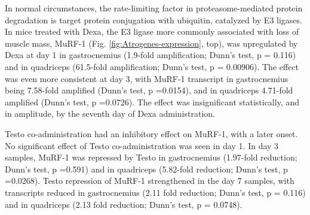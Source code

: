 \documentclass[12pt,english]{report}\usepackage[]{graphicx}\usepackage[]{color}
\begin{document}
In normal circumstances, the rate-limiting factor in proteasome-mediated
protein degradation is target protein conjugation with ubiquitin,
catalyzed by E3 ligases. In mice treated with Dexa, the E3 ligase
more commonly associated with loss of muscle mass, MuRF-1 (Fig. \ref{fig:Atrogenes-expression},
top), was upregulated by Dexa at day 1 in gastrocnemius (1.9-fold
amplification; Dunn's test, p = 0.116)
and in quadriceps (61.5-fold
amplification; Dunn's test, p = 0.00906).
The effect was even more consistent at day 3, with MuRF-1 transcript
in gastrocnemius being 7.58-fold
amplified (Dunn's test, p =0.0154),
and in quadriceps 4.71-fold
amplified (Dunn's test, p =0.0726).
The effect was insignificant statistically, and in amplitude, by the
seventh day of Dexa administration.

Testo co-administration had an inhibitory effect on MuRF-1, with a
later onset. No significant effect of Testo co-administration was
seen in day 1. In day 3 samples, MuRF-1 was repressed by Testo in
gastrocnemius (1.97-fold
reduction; Dunn's test, p =0.591)
and in quadriceps (5.82-fold
reduction; Dunn's test, p =0.0268).
Testo repression of MuRF-1 strengthened in the day 7 samples, with
transcripts reduced in gastrocnemius (2.11
fold reduction; Dunn's test, p = 0.116)
and in quadriceps (2.13
fold reduction; Dunn's test, p = 0.0748).
\end{document}
